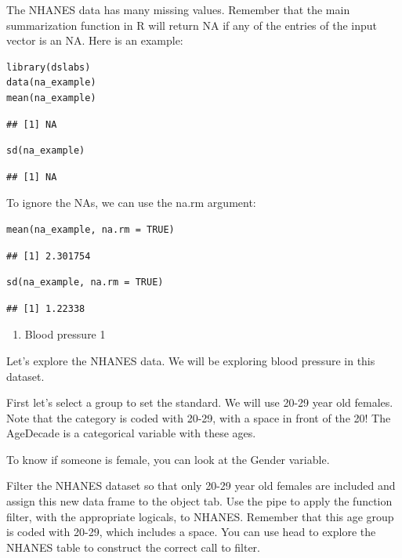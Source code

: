 \documentclass[
]{article}
\providecommand{\tightlist}{%
  \setlength{\itemsep}{0pt}\setlength{\parskip}{0pt}}
\begin{document}
The NHANES data has many missing values. Remember that the main
summarization function in R will return NA if any of the entries of the
input vector is an NA. Here is an example:

\begin{verbatim}
library(dslabs)
data(na_example)
mean(na_example)
\end{verbatim}

\begin{verbatim}
## [1] NA
\end{verbatim}

\begin{verbatim}
sd(na_example)
\end{verbatim}

\begin{verbatim}
## [1] NA
\end{verbatim}

To ignore the NAs, we can use the na.rm argument:

\begin{verbatim}
mean(na_example, na.rm = TRUE)
\end{verbatim}

\begin{verbatim}
## [1] 2.301754
\end{verbatim}

\begin{verbatim}
sd(na_example, na.rm = TRUE)
\end{verbatim}

\begin{verbatim}
## [1] 1.22338
\end{verbatim}

\begin{enumerate}
\def\labelenumi{\arabic{enumi}.}
\tightlist
\item
  Blood pressure 1
\end{enumerate}

Let's explore the NHANES data. We will be exploring blood pressure in
this dataset.

First let's select a group to set the standard. We will use 20-29 year
old females. Note that the category is coded with 20-29, with a space in
front of the 20! The AgeDecade is a categorical variable with these
ages.

To know if someone is female, you can look at the Gender variable.

Filter the NHANES dataset so that only 20-29 year old females are
included and assign this new data frame to the object tab. Use the pipe
to apply the function filter, with the appropriate logicals, to NHANES.
Remember that this age group is coded with 20-29, which includes a
space. You can use head to explore the NHANES table to construct the
correct call to filter.
\end{document}
